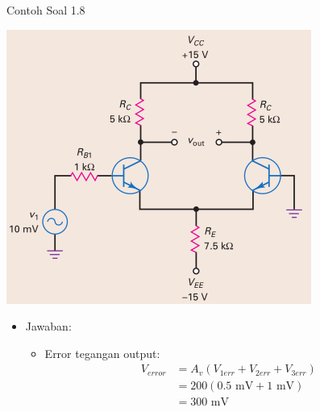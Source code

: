 \documentclass[aspectratio=169]{beamer}
\begin{document}
\begin{frame}{Contoh Soal 1.8}
	\begin{multicols}{2}
		\begin{center}
			\includegraphics[height=0.7\textheight]{gambar/01.latihan_soal_8}
		\end{center}
		\columnbreak
		\begin{itemize}
			\item Jawaban:
			\begin{itemize}
				\item Error tegangan output:
				\begin{align*}
					V_{error} &= A_v (V_{1err} + V_{2err} + V_{3err}) \\
					&= 200(0.5 \text{ mV} + 1 \text{ mV}) \\
					&= 300 \text{ mV}
				\end{align*}
			\end{itemize}
		\end{itemize}
	\end{multicols}
\end{frame}
\end{document}
